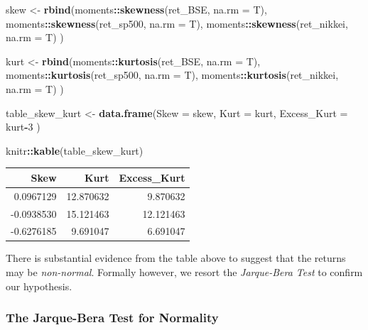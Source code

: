 \documentclass[11pt,]{article}
\newenvironment{Shaded}{\begin{snugshade}}{\end{snugshade}}
\newcommand{\KeywordTok}[1]{\textcolor[rgb]{0.13,0.29,0.53}{\textbf{#1}}}
\newcommand{\DataTypeTok}[1]{\textcolor[rgb]{0.13,0.29,0.53}{#1}}
\newcommand{\DecValTok}[1]{\textcolor[rgb]{0.00,0.00,0.81}{#1}}
\newcommand{\StringTok}[1]{\textcolor[rgb]{0.31,0.60,0.02}{#1}}
\newcommand{\OperatorTok}[1]{\textcolor[rgb]{0.81,0.36,0.00}{\textbf{#1}}}
\newcommand{\NormalTok}[1]{#1}
\begin{document}
\begin{Shaded}
\begin{Highlighting}[]
\NormalTok{skew <-}\StringTok{ }\KeywordTok{rbind}\NormalTok{(moments}\OperatorTok{::}\KeywordTok{skewness}\NormalTok{(ret_BSE, }\DataTypeTok{na.rm =}\NormalTok{ T),}
\NormalTok{              moments}\OperatorTok{::}\KeywordTok{skewness}\NormalTok{(ret_sp500, }\DataTypeTok{na.rm =}\NormalTok{ T),}
\NormalTok{              moments}\OperatorTok{::}\KeywordTok{skewness}\NormalTok{(ret_nikkei, }\DataTypeTok{na.rm =}\NormalTok{ T)}
\NormalTok{              )}

\NormalTok{kurt <-}\StringTok{ }\KeywordTok{rbind}\NormalTok{(moments}\OperatorTok{::}\KeywordTok{kurtosis}\NormalTok{(ret_BSE, }\DataTypeTok{na.rm =}\NormalTok{ T),}
\NormalTok{              moments}\OperatorTok{::}\KeywordTok{kurtosis}\NormalTok{(ret_sp500, }\DataTypeTok{na.rm =}\NormalTok{ T),}
\NormalTok{              moments}\OperatorTok{::}\KeywordTok{kurtosis}\NormalTok{(ret_nikkei, }\DataTypeTok{na.rm =}\NormalTok{ T)}
\NormalTok{              )}

\NormalTok{table_skew_kurt <-}\StringTok{ }\KeywordTok{data.frame}\NormalTok{(}\DataTypeTok{Skew =}\NormalTok{ skew, }
                              \DataTypeTok{Kurt =}\NormalTok{ kurt,}
                              \DataTypeTok{Excess_Kurt =}\NormalTok{ kurt}\OperatorTok{-}\DecValTok{3}
\NormalTok{                              )}

\NormalTok{knitr}\OperatorTok{::}\KeywordTok{kable}\NormalTok{(table_skew_kurt)}
\end{Highlighting}
\end{Shaded}

\begin{longtable}[]{@{}rrr@{}}
\toprule
Skew & Kurt & Excess\_Kurt\tabularnewline
\midrule
\endhead
0.0967129 & 12.870632 & 9.870632\tabularnewline
-0.0938530 & 15.121463 & 12.121463\tabularnewline
-0.6276185 & 9.691047 & 6.691047\tabularnewline
\bottomrule
\end{longtable}

There is substantial evidence from the table above to suggest that the
returns may be \emph{non-normal}. Formally however, we resort the
\emph{Jarque-Bera Test} to confirm our hypothesis.

\subsubsection{The Jarque-Bera Test for
Normality}\label{the-jarque-bera-test-for-normality}
\end{document}
